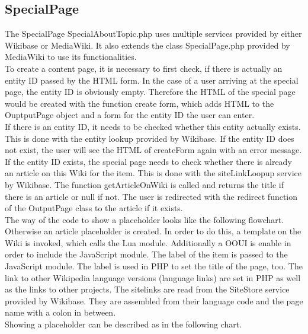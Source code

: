 \subsection{SpecialPage}

The SpecialPage SpecialAboutTopic.php uses multiple services provided by either Wikibase or MediaWiki. It also extends the class SpecialPage.php provided by MediaWiki to use its functionalities. \\
To create a content page, it is necessary to first check, if there is actually an entity ID passed by the HTML form. In the case of a user arriving at the special page, the entity ID is obviously empty. Therefore the HTML of the special page would be created with the function create form, which adds HTML to the OuptputPage object and a form for the entity ID the user can enter. \\
If there is an entity ID, it needs to be checked whether this entity actually exists. This is done with the entity lookup provided by Wikibase. If the entity ID does not exist, the user will see the HTML of createForm again with an error message.
If the entity ID exists, the special page needs to check whether there is already an article on this Wiki for the item. This is done with the siteLinkLoopup service by Wikibase. The function getArticleOnWiki is called and returns the title if there is an article or null if not. The user is redirected with the redirect function of the OutputPage class to the article if it exists.  \\
The way of the code to show a placeholder looks like the following flowchart. \\



Otherwise an article placeholder is created. In order to do this, a template on the Wiki is invoked, which calls the Lua module. Additionally a OOUI is enable in order to include the JavaScript module. The label of the item is passed to the JavaScript module. The label is used in PHP to set the title of the page, too. The link to other Wikipedia language versions (language links) are set in PHP as well as the links to other projects. The sitelinks are read from the SiteStore service provided by Wikibase. They are assembled from their language code and the page name with a colon in between. \\
Showing a placeholder can be described as in the following chart. \\ 

